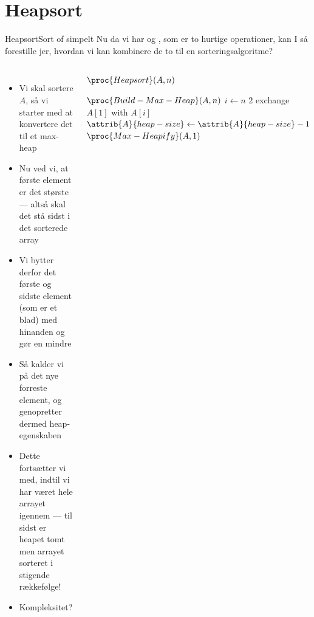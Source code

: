 \documentclass[aspectratio=1610]{beamer}
\begin{document}
\section{Heapsort}

\begin{frame}{Heapsort}{Sort of simpelt}
    Nu da vi har  og , som er to hurtige
    operationer, kan I så forestille jer, hvordan vi kan kombinere de to til en
    sorteringsalgoritme?

    \begin{columns}
        \begin{itemize}
            \small
            \item<2-> Vi skal sortere $A$, så vi starter med at konvertere det til
                et max-heap
            \item<3-> Nu ved vi, at første element er det største --- altså skal det
                stå sidst i det sorterede array
            \item<4-> Vi bytter derfor det første og sidste element (som er et blad)
                med hinanden og gør  en mindre
            \item<5-> Så kalder vi  på det nye forreste element,
                og genopretter dermed heap-egenskaben
            \item<6-> Dette fortsætter vi med, indtil vi har været hele arrayet
                igennem --- til sidst er heapet tomt men arrayet sorteret i
                stigende rækkefølge!
            \item<7-> Kompleksitet?
        \end{itemize}
    
        \begin{block}{$\proc{Heapsort}(A,n)$}
            
            \vspace{-\abovedisplayskip}
            \begin{codebox}
                \li $\proc{Build-Max-Heap}(A,n)$
                \li \For $i \gets n$ \Downto $2$
                \li     \Do
                            exchange $A[1]$ with $A[i]$
                \li         $\attrib{A}{heap-size} \gets \attrib{A}{heap-size}
                            - 1$
                \li         $\proc{Max-Heapify}(A,1)$         
                        \End
            \end{codebox}
        \end{block}
    \end{columns}
\end{frame}
\end{document}
